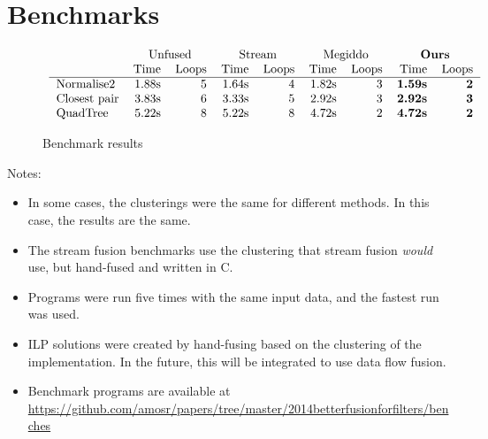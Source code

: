 \section{Benchmarks}
\label{s:Benchmarks}

\begin{figure*}
$$\begin{array}{c}

\begin{tabular}{lrrrrrrrr}
                &   \multicolumn{2}{c}{Unfused}         & \multicolumn{2}{c}{Stream}
                & \multicolumn{2}{c}{Megiddo} &\multicolumn{2}{c}{\textbf{Ours}} \\
                & Time & Loops   & Time & Loops      & Time & Loops & Time & Loops   \\
\hline
Normalise2      & 1.88s & 5      & 1.64s & 4          & 1.82s & 3  & \textbf{1.59s} & \textbf{2}\\
Closest pair    & 3.83s & 6      & 3.33s & 5          & 2.92s & 3  & \textbf{2.92s} & \textbf{3}\\
QuadTree        & 5.22s & 8      & 5.22s & 8          & 4.72s & 2  & \textbf{4.72s} & \textbf{2}\\
\end{tabular}

\end{array}$$
\caption{Benchmark results}
\label{f:BenchResults}
\end{figure*}

Notes:
\begin{itemize}
\item
In some cases, the clusterings were the same for different methods. In this case, the results are the same. 
\item
The stream fusion benchmarks use the clustering that stream fusion \emph{would} use, but hand-fused and written in C.
\item
Programs were run five times with the same input data, and the fastest run was used.
\item
ILP solutions were created by hand-fusing based on the clustering of the implementation. In the future, this will be integrated to use data flow fusion.
\item
Benchmark programs are available at \url{https://github.com/amosr/papers/tree/master/2014betterfusionforfilters/benches}
\end{itemize}


